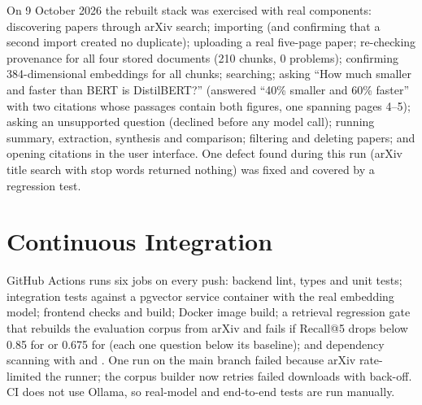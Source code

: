 On 9 October 2026 the rebuilt stack was exercised with real components: discovering papers through arXiv search;
importing  (and confirming that a second import created no duplicate); uploading a real five-page
paper; re-checking provenance for all four stored documents (210 chunks, 0 problems); confirming 384-dimensional
embeddings for all chunks; searching; asking ``How much smaller and faster than BERT is DistilBERT?'' (answered
``40\% smaller and 60\% faster'' with two citations whose passages contain both figures, one spanning pages 4--5);
asking an unsupported question (declined before any model call); running summary, extraction, synthesis and
comparison; filtering and deleting papers; and opening citations in the user interface. One defect found during
this run (arXiv title search with stop words returned nothing) was fixed and covered by a regression test.

\section{Continuous Integration}

GitHub Actions runs six jobs on every push: backend lint, types and unit tests; integration tests against a pgvector
service container with the real embedding model; frontend checks and build; Docker image build; a retrieval
regression gate that rebuilds the evaluation corpus from arXiv and fails if Recall@5 drops below 0.85 for
 or 0.675 for  (each one question below its baseline); and dependency scanning with
 and . One run on the main branch failed because arXiv rate-limited the runner;
the corpus builder now retries failed downloads with back-off. CI does not use Ollama, so real-model and end-to-end
tests are run manually.
